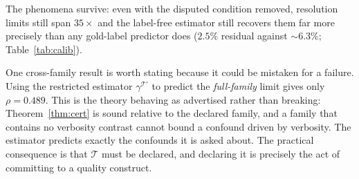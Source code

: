 \documentclass{article}
\theoremstyle{plain}
\theoremstyle{definition}
\newcommand{\bgap}{\gamma}
\begin{document}
The phenomena survive: even with the disputed condition removed, resolution limits still span
$35\times$ and the label-free estimator still recovers them far more precisely than any
gold-label predictor does ($2.5\%$ residual against $\sim$$6.3\%$; Table~\ref{tab:calib}).

One cross-family result is worth stating because it could be mistaken for a failure. Using the
restricted estimator $\bgap^{\mathcal{T}'}$ to predict the \emph{full-family} limit gives
only $\rho=0.489$. This is the theory behaving as advertised rather than breaking:
Theorem~\ref{thm:cert} is sound relative to the declared family, and a family that contains no
verbosity contrast cannot bound a confound driven by verbosity. The estimator predicts exactly
the confounds it is asked about. The practical consequence is that $\mathcal{T}$ must be
declared, and declaring it is precisely the act of committing to a quality construct.
\end{document}

